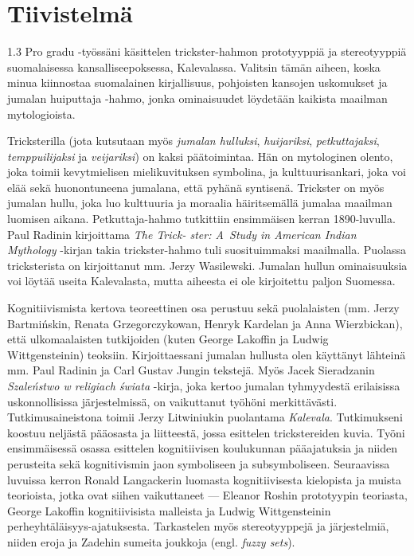 \documentclass[11pt,a4paper,twoside]{report}
\begin{document}
\chapter*{Tiivistelmä}
\begin{spacing}{1.3}
\noindent
Pro gradu -työssäni käsittelen trickster-hahmon prototyyppiä ja stereotyyppiä suomalaisessa kansalliseepoksessa, Kalevalassa. Valitsin tämän aiheen, koska minua kiinnostaa suomalainen kirjallisuus, pohjoisten kansojen uskomukset ja jumalan huiputtaja -hahmo, jonka ominaisuudet löydetään kaikista maailman mytologioista.

Tricksterilla (jota kutsutaan myös \emph{jumalan hulluksi}, \emph{huijariksi}, \emph{petkuttajaksi}, \emph{temppuilijaksi} ja \emph{veijariksi}) on kaksi päätoimintaa. Hän on mytologinen olento, joka toimii kevytmielisen mielikuvituksen symbolina, ja kulttuurisankari, joka voi elää sekä huonontuneena jumalana, että pyhänä syntisenä. Trickster on myös jumalan hullu, joka luo kulttuuria ja moraalia häiritsemällä jumalaa maailman luomisen aikana. Petkuttaja-hahmo tutkittiin ensimmäisen kerran 1890-luvulla. Paul Radinin kirjoittama \emph{The Trick- ster: A~Study in American Indian Mythology} -kirjan takia trickster-hahmo tuli suosituimmaksi maailmalla. Puolassa tricksterista on kirjoittanut mm. Jerzy Wasilewski. Jumalan hullun ominaisuuksia voi löytää useita Kalevalasta, mutta aiheesta ei ole kirjoitettu paljon Suomessa.

Kognitiivismista kertova teoreettinen osa perustuu sekä puolalaisten (mm. Jerzy Bartmińskin, Renata Grzegorczykowan, Henryk Kardelan ja Anna Wierzbickan), että ulkomaalaisten tutkijoiden (kuten George Lakoffin ja Ludwig Wittgensteinin) teoksiin. Kirjoittaessani jumalan hullusta olen käyttänyt lähteinä mm. Paul Radinin ja Carl Gustav Jungin tekstejä. Myös Jacek Sieradzanin \emph{Szaleństwo w religiach świata} -kirja, joka kertoo jumalan tyhmyydestä erilaisissa uskonnollisissa järjestelmissä, on vaikuttanut työhöni merkittävästi. Tutkimusaineistona toimii Jerzy Litwiniukin puolantama \textit{Kalevala}. Tutkimukseni koostuu neljästä pääosasta ja liitteestä, jossa esittelen trickstereiden kuvia.
\newpage
\vspace*{2.5\baselineskip}
Työni ensimmäisessä osassa esittelen kognitiivisen koulukunnan pääajatuksia ja niiden perusteita sekä kognitivismin jaon symboliseen ja subsymboliseen. Seuraavissa luvuissa kerron Ronald Langackerin luomasta kognitiivisesta kielopista ja muista teorioista, jotka ovat siihen vaikuttaneet --- Eleanor Roshin prototyypin teoriasta, George Lakoffin kognitiivisista malleista ja Ludwig Wittgensteinin perheyhtäläisyys-ajatuksesta. Tarkastelen myös stereotyyppejä ja järjestelmiä, niiden eroja ja Zadehin sumeita joukkoja (engl. \emph{fuzzy sets}).


\end{spacing}
\end{document}
